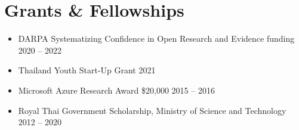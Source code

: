 \section{\sc Grants \& Fellowships}

\begin{itemize}[leftmargin=0cm, label={}]
\itemsep0em

\item DARPA Systematizing Confidence in Open Research and Evidence funding \hfill 2020 -- 2022

\item Thailand Youth Start-Up Grant \hfill 2021

\item Microsoft Azure Research Award \$20,000 \hfill 2015 -- 2016

\item Royal Thai Government Scholarship, Ministry of Science and Technology \hfill 2012 -- 2020

\end{itemize}
